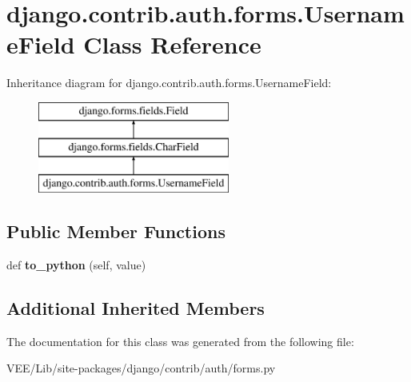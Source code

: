 \hypertarget{classdjango_1_1contrib_1_1auth_1_1forms_1_1_username_field}{}\section{django.\+contrib.\+auth.\+forms.\+Username\+Field Class Reference}
\label{classdjango_1_1contrib_1_1auth_1_1forms_1_1_username_field}
Inheritance diagram for django.\+contrib.\+auth.\+forms.\+Username\+Field\+:\begin{figure}[H]
\begin{center}
\leavevmode
\includegraphics[height=3.000000cm]{classdjango_1_1contrib_1_1auth_1_1forms_1_1_username_field}
\end{center}
\end{figure}
\subsection*{Public Member Functions}
\begin{DoxyCompactItemize}
\item 
\mbox{\label{classdjango_1_1contrib_1_1auth_1_1forms_1_1_username_field_a96bfe83529d7dc2d5a36251a8c64f2ee}} 
def {\bfseries to\+\_\+python} (self, value)
\end{DoxyCompactItemize}
\subsection*{Additional Inherited Members}


The documentation for this class was generated from the following file\+:\begin{DoxyCompactItemize}
\item 
V\+E\+E/\+Lib/site-\/packages/django/contrib/auth/forms.\+py\end{DoxyCompactItemize}
